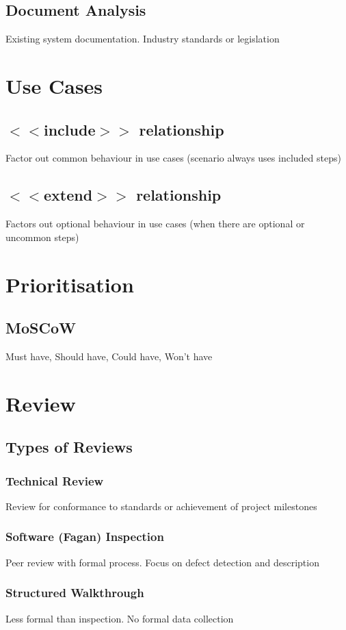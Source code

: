 \documentclass[10pt,a4paper]{article}
\begin{document}
\begin{landscape}
\begin{multicols}{3}
\subsection{Document Analysis}
Existing system documentation. Industry standards or legislation

\section{Use Cases}
\subsection{$<<$include$>>$ relationship}
Factor out common behaviour in use cases (scenario always uses included steps)
\subsection{$<<$extend$>>$ relationship}
Factors out optional behaviour in use cases (when there are optional or uncommon steps)

\section{Prioritisation}
\subsection{MoSCoW}
Must have, Should have, Could have, Won't have

\section{Review}
\subsection{Types of Reviews}
\subsubsection{Technical Review}
Review for conformance to standards or achievement of project milestones
\subsubsection{Software (Fagan) Inspection}
Peer review with formal process. Focus on defect detection and description
\subsubsection{Structured Walkthrough}
Less formal than inspection. No formal data collection

\end{multicols}
\end{landscape}
\end{document}
